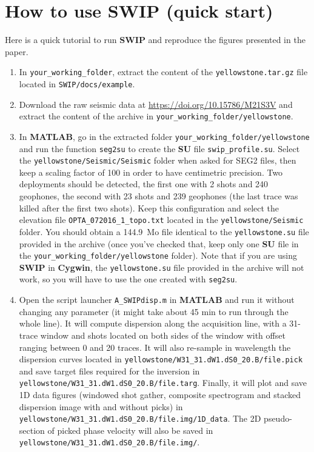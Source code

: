 \documentclass[twoside,a4paper]{article}
\def\SWIP{\textbf{SWIP}}
\def\SU{\textbf{SU}}
\def\MATLAB{\textbf{MATLAB}}
\def\Cygwin{\textbf{Cygwin}}
\begin{document}
\section{How to use SWIP (quick start)}
Here is a quick tutorial to run {\SWIP} and reproduce the figures presented in the paper.

\begin{enumerate}[leftmargin=*]
\setlength\itemsep{2ex}
\item In \verb|your_working_folder|, extract the content of the \verb|yellowstone.tar.gz| file located in \verb|SWIP/docs/example|.

\item Download the raw seismic data at \url{https://doi.org/10.15786/M21S3V} and extract the content of the archive in \verb|your_working_folder/yellowstone|.

\item In {\MATLAB}, go in the extracted folder \verb|your_working_folder/yellowstone| and run the function \verb|seg2su| to create the {\SU} file \verb|swip_profile.su|. Select the \verb|yellowstone/Seismic/Seismic| folder when asked for SEG2 files, then keep a scaling factor of 100 in order to have centimetric precision. Two deployments should be detected, the first one with 2 shots and 240 geophones, the second with 23 shots and 239 geophones (the last trace was killed after the first two shots). Keep this configuration and select the elevation file \verb|OPTA_072016_1_topo.txt| located in the \verb|yellowstone/Seismic| folder. You should obtain a 144.9~Mo file identical to the \verb|yellowstone.su| file provided in the archive (once you've checked that, keep only one {\SU} file in the \verb|your_working_folder/yellowstone| folder). Note that if you are using {\SWIP} in {\Cygwin}, the \verb|yellowstone.su| file provided in the archive will not work, so you will have to use the one created with \verb|seg2su|.

\item Open the script launcher \verb|A_SWIPdisp.m| in {\MATLAB} and run it without changing any parameter (it might take about 45 min to run through the whole line). It will compute dispersion along the acquisition line, with a 31-trace window and shots located on both sides of the window with offset ranging between 0 and 20 traces. It will also re-sample in wavelength the dispersion curves located in \verb|yellowstone/W31_31.dW1.dS0_20.B/file.pick| and save target files required for the inversion in \verb|yellowstone/W31_31.dW1.dS0_20.B/file.targ|. Finally, it will plot and save 1D data figures (windowed shot gather, composite spectrogram and stacked dispersion image with and without picks) in \verb|yellowstone/W31_31.dW1.dS0_20.B/file.img/1D_data|. The 2D pseudo-section of picked phase velocity will also be saved in \verb|yellowstone/W31_31.dW1.dS0_20.B/file.img/|.


\end{enumerate}
\end{document}
